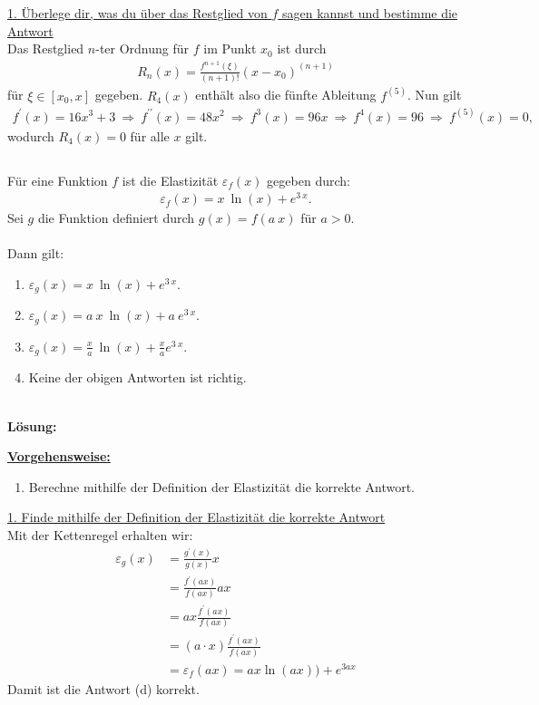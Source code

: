 \underline{1. Überlege dir, was du über das Restglied von $ f $ sagen kannst und bestimme die Antwort}\\
Das Restglied $ n $-ter Ordnung für $ f $ im Punkt $ x_0 $ ist durch
\begin{align*}
R_n(x) = \frac{f^{n+1}(\xi)}{(n+1)!}(x - x_0)^{(n+1)} 
\end{align*}
für $ \xi \in [x_0,x] $ gegeben. $ R_4(x) $ enthält also die fünfte Ableitung $ f^{(5)} $. Nun gilt
\begin{align*}
f^\prime(x) 
= 16 x^3 + 3
\ \Rightarrow \
f^{\prime \prime}(x) = 48 x^2 
\ \Rightarrow \ 
f^{3}(x) = 96 x
\ \Rightarrow \
f^{4}(x) = 96
\ \Rightarrow \ 
f^{(5)}(x) = 0,
\end{align*}  
wodurch $ R_4(x) = 0  $ für alle $ x $ gilt.



\newpage

\subsection*{}
Für eine Funktion $ f $ ist die Elastizität $ \varepsilon_f(x) $ gegeben durch:
\begin{align*}
\varepsilon_f(x) =x \ \ln (x) + e^{3 \ x}.
\end{align*}
Sei $ g $ die Funktion definiert durch $ g(x) = f( a \ x) $ für $ a > 0 $.\\
\\
Dann gilt:
\renewcommand{\labelenumi}{(\alph{enumi})}
\begin{enumerate}
	\item 
	$ \varepsilon_g(x) = x \ \ln(x)  + e^{3 \ x}$.
	\item
	$ \varepsilon_g(x) =a \  x \ \ln(x)  +a \   e^{3 \ x} $.
	\item
	$ \varepsilon_g(x) =\frac{x}{a} \ \ln(x)  +\frac{x}{a}   e^{3 \ x} $.
	\item
	Keine der obigen Antworten ist richtig.
\end{enumerate}
\ \\
\textbf{Lösung:}
\begin{mdframed}
\underline{\textbf{Vorgehensweise:}}
\renewcommand{\labelenumi}{\theenumi.}
\begin{enumerate}
\item Berechne mithilfe der Definition der Elastizität die korrekte Antwort.
\end{enumerate}
\end{mdframed}

\underline{1. Finde mithilfe der Definition der Elastizität die korrekte Antwort}\\
Mit der Kettenregel erhalten wir:
\begin{align*}
\varepsilon_g (x)
&= 
 \frac{g^\prime(x)}{g(x)} x\\
&=
 \frac{ f^\prime (ax)}{f(ax)} ax \\
&=
ax \frac{ f^\prime (ax)}{f(ax)}  \\
&=
(a \cdot x) \frac{ f^\prime (ax)}{f(ax)}\\
&=  \varepsilon_f(ax)
=ax \ln(ax)) + e^{3ax}
\end{align*}
Damit ist die Antwort (d) korrekt.

\newpage